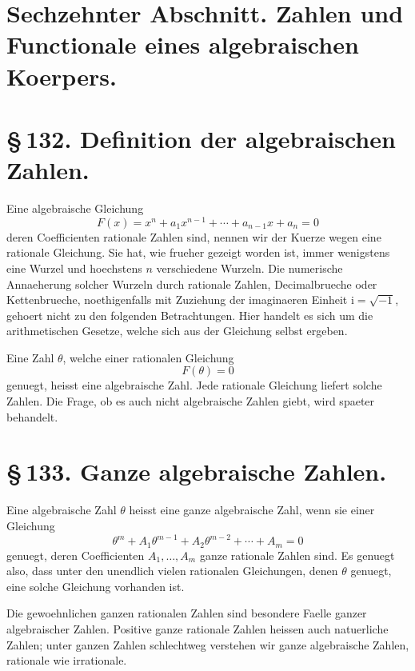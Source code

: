 \documentclass[11pt]{article}
\newcommand{\ii}{\mathrm{i}}
\begin{document}
\section*{Sechzehnter Abschnitt. Zahlen und Functionale eines algebraischen Koerpers.}

\section*{\S\,132. Definition der algebraischen Zahlen.}

Eine algebraische Gleichung
\begin{equation}
F(x)=x^n+a_1x^{n-1}+\cdots +a_{n-1}x+a_n=0
\tag{1}
\end{equation}
deren Coefficienten rationale Zahlen sind, nennen wir der Kuerze
wegen eine rationale Gleichung. Sie hat, wie frueher gezeigt worden
ist, immer wenigstens eine Wurzel und hoechstens \(n\) verschiedene
Wurzeln. Die numerische Annaeherung solcher Wurzeln durch rationale
Zahlen, Decimalbrueche oder Kettenbrueche, noethigenfalls mit
Zuziehung der imaginaeren Einheit \(\ii=\sqrt{-1}\), gehoert nicht zu
den folgenden Betrachtungen. Hier handelt es sich um die
arithmetischen Gesetze, welche sich aus der Gleichung selbst ergeben.

Eine Zahl \(\theta\), welche einer rationalen Gleichung
\begin{equation}
F(\theta)=0
\end{equation}
genuegt, heisst eine algebraische Zahl. Jede rationale Gleichung
liefert solche Zahlen. Die Frage, ob es auch nicht algebraische
Zahlen giebt, wird spaeter behandelt.

\section*{\S\,133. Ganze algebraische Zahlen.}

Eine algebraische Zahl \(\theta\) heisst eine ganze algebraische Zahl,
wenn sie einer Gleichung
\begin{equation}
\theta^m+A_1\theta^{m-1}+A_2\theta^{m-2}+\cdots +A_m=0
\tag{1}
\end{equation}
genuegt, deren Coefficienten \(A_1,\ldots,A_m\) ganze rationale Zahlen
sind. Es genuegt also, dass unter den unendlich vielen rationalen
Gleichungen, denen \(\theta\) genuegt, eine solche Gleichung vorhanden
ist.

Die gewoehnlichen ganzen rationalen Zahlen sind besondere Faelle
ganzer algebraischer Zahlen. Positive ganze rationale Zahlen heissen
auch natuerliche Zahlen; unter ganzen Zahlen schlechtweg verstehen wir
ganze algebraische Zahlen, rationale wie irrationale.
\end{document}
